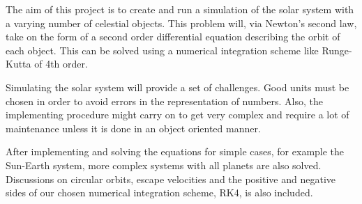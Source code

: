 The aim of this project is to create and run a simulation of the
solar system with a varying number of celestial objects. This
problem will, via Newton's second law, take on the form of a second
order differential equation describing the orbit of each object.
This can be solved using a numerical integration scheme like
Runge-Kutta of 4th order.

Simulating the solar system will provide a set of challenges. Good
units must be chosen in order to avoid errors in the representation
of numbers. Also, the implementing procedure might carry on to get
very complex and require a lot of maintenance unless it is done in
an object oriented manner.

After implementing and solving the equations for simple cases, for
example the Sun-Earth system, more complex systems with all planets
are also solved. Discussions on circular orbits, escape velocities
and the positive and negative sides of our chosen numerical
integration scheme, RK4, is also included.
